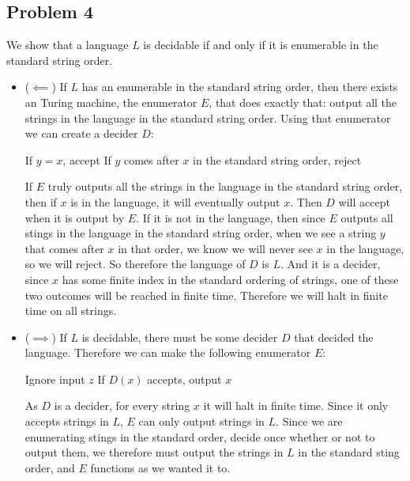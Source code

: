 \documentclass[english]{article}
\begin{document}
\subsection*{Problem 4}
We show that a language $L$ is decidable if and only if it is enumerable in
the standard string order.
\begin{itemize}
\item ($ \impliedby $) If $L$ has an enumerable in the standard string
order, then there exists an Turing machine, the enumerator $E$, that
does exactly that: output all the strings in the language in the standard
string order. Using that enumerator we can create a decider $D$:
\begin{algorithmic}
		\State If $y = x$, accept
		\State If $y$ comes after $x$ in the standard string order, reject
	\EndFor
\EndFunction
\end{algorithmic}

If $E$ truly outputs all the strings in the language in the standard string
order, then if $x$ is in the language, it will eventually output $x$. Then
$D$ will accept when it is output by $E$. If it is not in the language, then
since $E$ outputs all stings in the language in the standard string order,
when we see a string $y$ that comes after $x$ in that order, we know we will
never see $x$ in the language, so we will reject. So therefore the language
of $D$ is $L$. And it is a decider, since $x$ has some finite
index in the standard ordering of strings, one of these two outcomes will
be reached in finite time. Therefore we will halt in finite time on all
strings.

\item ($ \implies $) If $L$ is decidable, there must be some decider $D$
that decided the language. Therefore we can make the following enumerator
$E$:
\begin{algorithmic}
	\State Ignore input $z$
		\State If $D(x)$ accepts, output $x$
	\EndFor
\EndFunction
\end{algorithmic}

As $D$ is a decider, for every string $x$ it will halt in finite time.
Since it only accepts strings in $L$, $E$ can only output strings in $L$.
Since we are enumerating stings in the standard order, decide once 
whether or not to output them, we therefore must output the strings in
$L$ in the standard sting order, and $E$ functions as we wanted it to.

\end{itemize}
\end{document}
